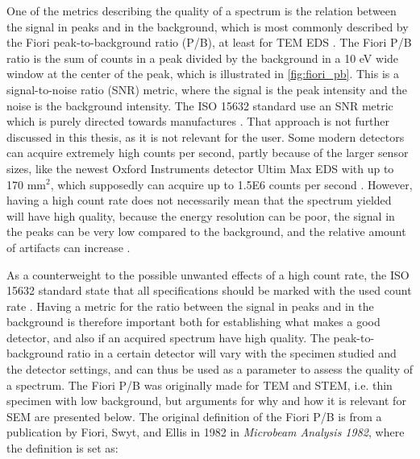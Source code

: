 One of the metrics describing the quality of a spectrum is the relation between the signal in peaks and in the background, which is most commonly described by the Fiori peak-to-background ratio (P/B), at least for TEM EDS \cite{williams_carter_tem_2009}.
The Fiori P/B ratio is the sum of counts in a peak divided by the background in a 10 eV wide window at the center of the peak, which is illustrated in \cref{fig:fiori_pb}.
This is a signal-to-noise ratio (SNR) metric, where the signal is the peak intensity and the noise is the background intensity.
The ISO 15632 standard use an SNR metric which is purely directed towards manufactures \cite{iso_qc_15632}.
That approach is not further discussed in this thesis, as it is not relevant for the user.
Some modern detectors can acquire extremely high counts per second, partly because of the larger sensor sizes, like the newest Oxford Instruments detector Ultim Max EDS with up to 170 mm$^2$, which supposedly can acquire up to 1.5E6 counts per second \cite{oxford_ultim_max}.
However, having a high count rate does not necessarily mean that the spectrum yielded will have high quality, because the energy resolution can be poor, the signal in the peaks can be very low compared to the background, and the relative amount of artifacts can increase \cite{iso_qc_15632}.


As a counterweight to the possible unwanted effects of a high count rate, the ISO 15632 standard state that all specifications should be marked with the used count rate \cite{iso_qc_15632}.
Having a metric for the ratio between the signal in peaks and in the background is therefore important both for establishing what makes a good detector, and also if an acquired spectrum have high quality.
The peak-to-background ratio in a certain detector will vary with the specimen studied and the detector settings, and can thus be used as a parameter to assess the quality of a spectrum.
The Fiori P/B was originally made for TEM and STEM, i.e. thin specimen with low background, but arguments for why and how it is relevant for SEM are presented below.
The original definition of the Fiori P/B is from a publication by Fiori, Swyt, and Ellis in 1982 \cite{fiori_peak_background_1982} in \emph{Microbeam Analysis 1982}, where the definition is set as:

